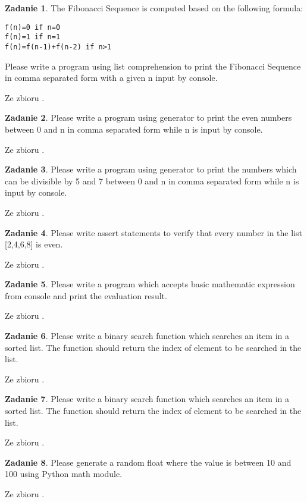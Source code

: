 \documentclass[11pt]{article}
\theoremstyle{definition}
\newtheorem{zadanie}{Zadanie}
\newcommand{\fromA}{\small Ze zbioru \cite{python100}.}
\begin{document}
\begin{zadanie}
The Fibonacci Sequence is computed based on the following formula:

\begin{verbatim}
f(n)=0 if n=0
f(n)=1 if n=1
f(n)=f(n-1)+f(n-2) if n>1
\end{verbatim}

Please write a program using list comprehension to print the Fibonacci Sequence in comma separated form with a given n input by console.

\fromA
\end{zadanie}
\begin{zadanie}
Please write a program using generator to print the even numbers between 0 and n in comma separated form while n is input by console.

\fromA
\end{zadanie}
\begin{zadanie}
Please write a program using generator to print the numbers which can be divisible by 5 and 7 between 0 and n in comma separated form while n is input by console.

\fromA
\end{zadanie}
\begin{zadanie}
Please write assert statements to verify that every number in the list [2,4,6,8] is even.

\fromA
\end{zadanie}
\begin{zadanie}
Please write a program which accepts basic mathematic expression from console and print the evaluation result.

\fromA
\end{zadanie}
\begin{zadanie}
Please write a binary search function which searches an item in a sorted list. The function should return the index of element to be searched in the list.

\fromA
\end{zadanie}
\begin{zadanie}
Please write a binary search function which searches an item in a sorted list. The function should return the index of element to be searched in the list.

\fromA
\end{zadanie}
\begin{zadanie}
Please generate a random float where the value is between 10 and 100 using Python math module.

\fromA
\end{zadanie}
\end{document}
